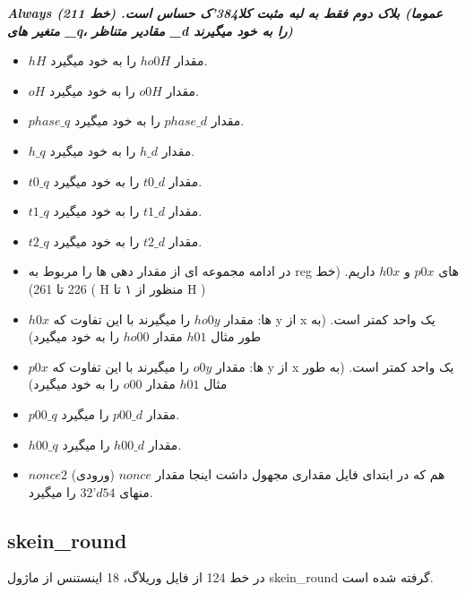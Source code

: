 \textit{\textbf{Always بلاک دوم فقط به لبه مثبت کلا384’ک حساس است. (خط 211)
	(عموما متغیر های \_q، مقادیر متناظر \_d را به خود میگیرند) }}
\begin{itemize}
	\item
	      $hH$ مقدار $ho0H$ را به خود میگیرد.
	\item
	      $oH$ مقدار $o0H$ را به خود میگیرد.
	\item
	      $phase\_q$ مقدار $phase\_d$ را به خود میگیرد.
	\item
	      $h\_q$ مقدار $h\_d$ را به خود میگیرد.
	\item
	      $t0\_q$ مقدار $t0\_d$ را به خود میگیرد.
	\item
	      $t1\_q$ مقدار $t1\_d$ را به خود میگیرد.
	\item
	      $t2\_q$ مقدار $t2\_d$ را به خود میگیرد.
	\item
	      در ادامه مجموعه ای از مقدار دهی ها را مربوط به reg های
	       $p0x$
	      و 
	      $h0x$ 
	داریم. (خط 226 تا 261)
	( H منظور از ۱ تا H )
	\item
	      $h0x$ ها: مقدار $ho0y$ را میگیرند با این تفاوت که y از x یک واحد کمتر است. (به طور مثال $h01$ مقدار $ho00$ را به خود میگیرد)
	\item
	      $p0x$  ها: مقدار $o0y$ را میگیرند با این تفاوت که y از x یک واحد کمتر است. (به طور مثال $h01$ مقدار $o00$ را به خود میگیرد)
	\item
	      $p00\_q$ مقدار $p00\_d$ را میگیرد.
	\item
	      $h00\_q$ مقدار $h00\_d$ را میگیرد.
	\item
	      $nonce2$ هم که در ابتدای فایل مقداری مجهول داشت اینجا مقدار $nonce$ (ورودی)  منهای 
	      $32’d54$
	       را میگیرد.
\end{itemize}


\subsection{skein\_round}
در خط 124 از فایل وریلاگ، 18 اینستنس از ماژول skein\_round گرفته شده است.
